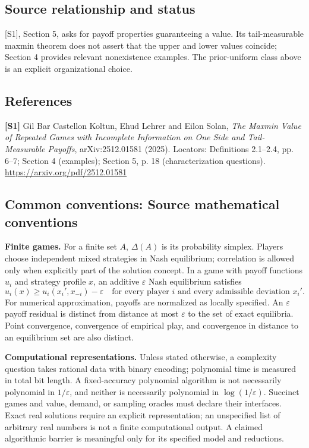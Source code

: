 \documentclass[11pt,a4paper]{article}
\begin{document}
\subsection*{Source relationship and status}
[S1], Section 5, asks for payoff properties guaranteeing a value. Its tail-measurable maxmin theorem does not assert that the upper and lower values coincide; Section 4 provides relevant nonexistence examples. The prior-uniform class above is an explicit organizational choice.
\subsection*{References}
\begingroup\footnotesize\raggedright
\textbf{[S1]} Gil Bar Castellon Koltun, Ehud Lehrer and Eilon Solan, \emph{The Maxmin Value of Repeated Games with Incomplete Information on One Side and Tail-Measurable Payoffs}, arXiv:2512.01581 (2025). Locators: Definitions 2.1--2.4, pp. 6--7; Section 4 (examples); Section 5, p. 18 (characterization questions). \url{https://arxiv.org/pdf/2512.01581}
\par\endgroup

\subsection*{Common conventions: Source mathematical conventions}

\textbf{Finite games.} For a finite set $A$, $\Delta(A)$ is its probability
simplex. Players choose independent mixed strategies in Nash equilibrium;
correlation is allowed only when explicitly part of the solution concept.
In a game with payoff functions $u_i$ and strategy profile $x$, an additive
$\varepsilon$ Nash equilibrium satisfies
\[
 u_i(x)\geq u_i(x_i',x_{-i})-\varepsilon
 \quad\text{for every player $i$ and every admissible deviation $x_i'$}.
\]
For numerical approximation, payoffs are normalized as locally specified.
An $\varepsilon$ payoff residual is distinct from distance at most
$\varepsilon$ to the set of exact equilibria. Point convergence, convergence
of empirical play, and convergence in distance to an equilibrium set are
also distinct.

\textbf{Computational representations.} Unless stated otherwise, a complexity
question takes rational data with binary encoding; polynomial time is measured
in total bit length. A fixed-accuracy polynomial algorithm is not necessarily
polynomial in $1/\varepsilon$, and neither is necessarily polynomial in
$\log(1/\varepsilon)$. Succinct games and value, demand, or sampling oracles
must declare their interfaces. Exact real solutions require an explicit
representation; an unspecified list of arbitrary real numbers is not a
finite computational output. A claimed algorithmic barrier is meaningful
only for its specified model and reductions.
\end{document}

